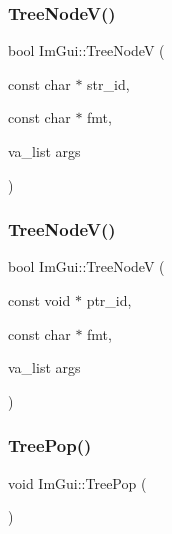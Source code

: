 \hypertarget{namespace_im_gui_a9bc1075c583973d76d8d65ea89787453}{}\label{namespace_im_gui_a9bc1075c583973d76d8d65ea89787453} 
\subsubsection{\texorpdfstring{Tree\+Node\+V()}{TreeNodeV()}\hspace{0.1cm}{\footnotesize\ttfamily [1/2]}}
{\footnotesize\ttfamily bool Im\+Gui\+::\+Tree\+NodeV (\begin{DoxyParamCaption}\item[{const char $\ast$}]{str\+\_\+id,  }\item[{const char $\ast$}]{fmt,  }\item[{va\+\_\+list}]{args }\end{DoxyParamCaption})}

\hypertarget{namespace_im_gui_a15320f61ba6b4916af3323bf7844602e}{}\label{namespace_im_gui_a15320f61ba6b4916af3323bf7844602e} 
\subsubsection{\texorpdfstring{Tree\+Node\+V()}{TreeNodeV()}\hspace{0.1cm}{\footnotesize\ttfamily [2/2]}}
{\footnotesize\ttfamily bool Im\+Gui\+::\+Tree\+NodeV (\begin{DoxyParamCaption}\item[{const void $\ast$}]{ptr\+\_\+id,  }\item[{const char $\ast$}]{fmt,  }\item[{va\+\_\+list}]{args }\end{DoxyParamCaption})}

\hypertarget{namespace_im_gui_a41ecf265e5f678c78fc9c30b3cf2077f}{}\label{namespace_im_gui_a41ecf265e5f678c78fc9c30b3cf2077f} 
\subsubsection{\texorpdfstring{Tree\+Pop()}{TreePop()}}
{\footnotesize\ttfamily void Im\+Gui\+::\+Tree\+Pop (\begin{DoxyParamCaption}{ }\end{DoxyParamCaption})}

